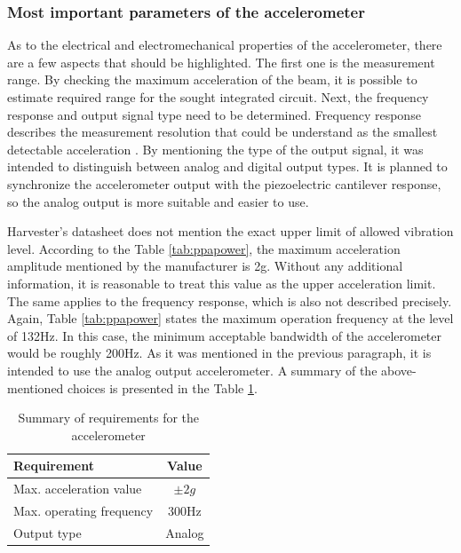 \documentclass[12pt,a4paper]{article}
\begin{document}
\subsubsection{Most important parameters of the accelerometer}
As to the electrical and electromechanical properties of the accelerometer, there are a few aspects that should be highlighted. The first one is the measurement range. By checking the maximum acceleration of the beam, it is possible to estimate required range for the sought integrated circuit. Next, the frequency response and output signal type need to be determined. Frequency response describes the measurement resolution that could be understand as the smallest detectable acceleration \cite{accel_params}. By mentioning the type of the output signal, it was intended to distinguish between analog and digital output types. It is planned to synchronize the accelerometer output with the piezoelectric cantilever response, so the analog output is more suitable and easier to use.
\par
Harvester's datasheet \cite{PPA} does not mention the exact upper limit of allowed vibration level. According to the Table \ref{tab:ppapower}, the maximum acceleration amplitude mentioned by the manufacturer is 2g. Without any additional information, it is reasonable to treat this value as the upper acceleration limit. The same applies to the frequency response, which is also not described precisely. Again, Table \ref{tab:ppapower} states the maximum operation frequency at the level of 132Hz. In this case, the minimum acceptable bandwidth of the accelerometer would be roughly 200Hz. As it was mentioned in the previous paragraph, it is intended to use the analog output accelerometer. A summary of the above-mentioned choices is presented in the Table \ref{tab:accel_requirements}.

\begin{table}[ht!]
\begin{tabular}{|l|c|}
\hline
\textbf{Requirement}            & \textbf{Value} \\ \hline
Max. acceleration value  		& $\pm{2}g$         \\ \hline
Max. operating frequency        & 300Hz        \\ \hline
Output type             		& Analog       \\ \hline
\end{tabular}
\caption{Summary of requirements for the accelerometer}
\label{tab:accel_requirements}
\end{table}
\par
\end{document}
